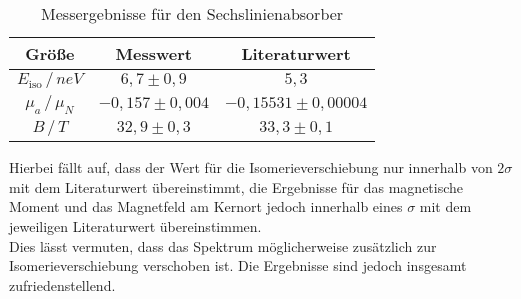 \begin{table}[h!]
	\centering
	\begin{tabular}{c|cc}
		Größe&Messwert&Literaturwert\\\hline
		$E_\mathrm{iso}\,/\,\si{neV}$&$6,7\pm0,9$&$5,3$ \footnotemark\\
		$\mu_a\,/\,\mu_N$&$-0,157\pm0,004$&$-0,15531\pm0,00004$ \cite{schatz}\\
		$B\,/\,\si{T}$&$32,9\pm0,3$&$33,3\pm0,1$ \cite{schatz}
	\end{tabular}
	\caption{Messergebnisse für den Sechslinienabsorber}
	\label{tab:sechslinien}
\end{table}

Hierbei fällt auf, dass der Wert für die Isomerieverschiebung nur innerhalb von $2\sigma$ mit dem Literaturwert übereinstimmt, die Ergebnisse für das magnetische Moment und das Magnetfeld am Kernort jedoch innerhalb eines $\sigma$ mit dem jeweiligen Literaturwert übereinstimmen.\\

Dies lässt vermuten, dass das Spektrum möglicherweise zusätzlich zur Isomerieverschiebung verschoben ist. Die Ergebnisse sind jedoch insgesamt zufriedenstellend.